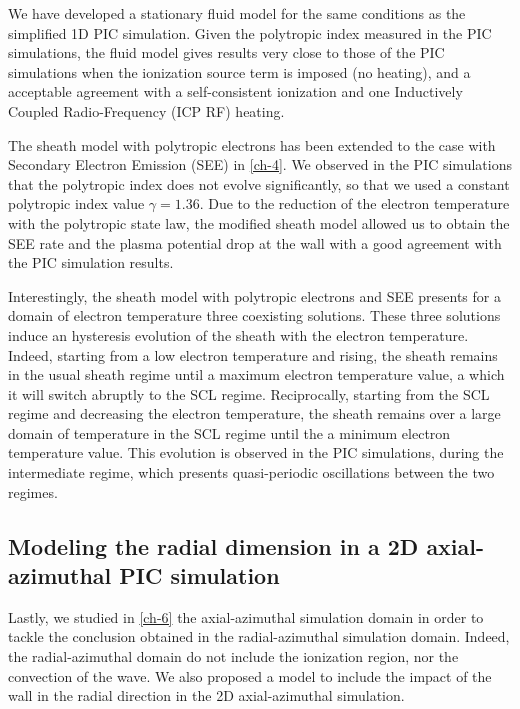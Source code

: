 We have developed a stationary fluid model for the same conditions as the simplified 1D PIC simulation.
Given the polytropic index measured in the PIC simulations, the fluid model gives results very close to those of the PIC simulations when the ionization source term is imposed (no heating), and a acceptable agreement with a self-consistent ionization and one Inductively Coupled Radio-Frequency (ICP RF) heating.

\vspace{1ex}
The sheath model with polytropic electrons has been extended to the case with Secondary Electron Emission (SEE) in \cref{ch-4}.
We observed in the PIC simulations that the polytropic index does not evolve significantly, so that we used a constant polytropic index value $\gamma=1.36$.
Due to the reduction of the electron temperature with the polytropic state law, the modified sheath model allowed us to obtain the SEE rate and the plasma potential drop at the wall with a good agreement with the PIC simulation results.

Interestingly, the sheath model with polytropic electrons and SEE presents for a domain of electron temperature three coexisting solutions.
These three solutions induce an hysteresis evolution of the sheath with the electron temperature.
Indeed, starting from a low electron temperature and rising, the sheath remains in the usual sheath regime until a maximum electron temperature value, a which it will switch abruptly to the SCL regime.
Reciprocally, starting from the SCL regime and decreasing the electron temperature, the sheath remains over a large domain of temperature in the SCL regime until the a minimum electron temperature value.
This evolution is observed in the PIC simulations, during the intermediate regime, which presents quasi-periodic oscillations between the two regimes. 


\subsection{Modeling the radial dimension in a 2D axial-azimuthal PIC simulation}

Lastly, we studied in \cref{ch-6} the axial-azimuthal simulation domain in order to tackle the conclusion obtained in the radial-azimuthal simulation domain.
Indeed, the radial-azimuthal domain do not include the ionization region, nor the convection of the wave.
We also proposed a model to include the impact of the wall in the radial direction in the 2D axial-azimuthal simulation.


